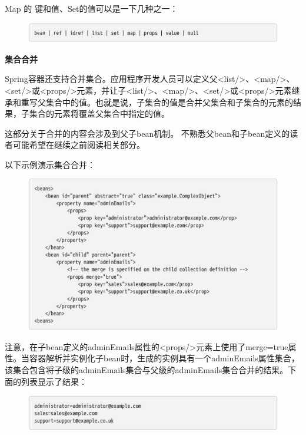 Map 的 键和值、Set的值可以是一下几种之一：

\begin{figure}[ht]
    \centering
    \includegraphics[width=1\linewidth]{./Figure/IMG_code_42.png}
\end{figure}

\noindent \small \textbf{集合合并}

Spring容器还支持合并集合。应用程序开发人员可以定义父<list/>、<map/>、<set/>或<props/>元素，并让子<list/>、<map/>、<set/>或<props/>元素继承和重写父集合中的值。也就是说，子集合的值是合并父集合和子集合的元素的结果，子集合的元素将覆盖父集合中指定的值。

这部分关于合并的内容会涉及到父子bean机制。
不熟悉父bean和子bean定义的读者可能希望在继续之前阅读相关部分。

以下示例演示集合合并：

\begin{figure}[ht]
    \centering
    \includegraphics[width=1\linewidth]{./Figure/IMG_code_43.png}
\end{figure}

注意，在子bean定义的adminEmails属性的<props/>元素上使用了merge=true属性。当容器解析并实例化子bean时，生成的实例具有一个adminEmails属性集合，该集合包含将子级的adminEmails集合与父级的adminEmails集合合并的结果。下面的列表显示了结果：

\begin{figure}[ht]
    \centering
    \includegraphics[width=1\linewidth]{./Figure/IMG_code_44.png}
\end{figure}


